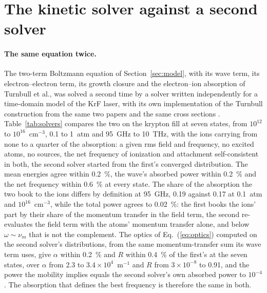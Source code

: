 \documentclass[11pt]{article}
\begin{document}
\section{The kinetic solver against a second solver}
\label{sec:solvers}

\paragraph{The same equation twice.}
The two-term Boltzmann equation of Section~\ref{sec:model}, with its wave term, its electron--electron term, its
growth closure and the electron--ion absorption of Turnbull et al., was solved a second time by a solver written
independently for a time-domain model of the KrF laser, with its own implementation of the Turnbull construction
from the same two papers \cite{T23,T24} and the same cross sections \cite{LXCat}. Table~\ref{tab:solvers} compares
the two on the krypton fill at seven states, from $10^{12}$ to $10^{16}$~cm$^{-3}$, 0.1 to 1~atm and 95~GHz to
10~THz, with the ions carrying from none to a quarter of the absorption: a given rms field and frequency, no
excited atoms, no sources, the net frequency of ionization and attachment self-consistent in both, the second
solver started from the first's converged distribution. The mean energies agree within 0.2~\%, the wave's absorbed
power within 0.2~\% and the net frequency within 0.6~\% at every state. The share of the absorption the two book
to the ions differs by definition at 95~GHz, 0.19 against 0.17 at 0.1~atm and $10^{16}$~cm$^{-3}$, while the
total power agrees to 0.02~\%: the first books the ions' part by their share of the momentum transfer in the
field term, the second re-evaluates the field term with the atoms' momentum transfer alone, and below
$\omega\sim\nu_m$ that is not the complement. The optics of Eq.~(\ref{eq:optics}) computed on the second solver's
distributions, from the same momentum-transfer sum its wave term uses, give $\alpha$ within 0.2~\% and $R$ within
0.4~\% of the first's at the seven states, over $\alpha$ from 2.3 to $3.4\times10^{4}$~m$^{-1}$ and $R$ from
$3\times10^{-8}$ to 0.91, and the power the mobility implies equals the second solver's own absorbed power to
$10^{-4}$. The absorption that defines the best frequency is therefore the same in both.
\end{document}
